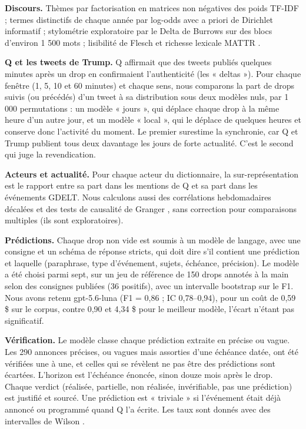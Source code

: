 \documentclass[11pt,a4paper]{article}
\begin{document}
\textbf{Discours.} Thèmes par factorisation en matrices non négatives \parencite{lee1999nmf} des poids TF-IDF ; termes distinctifs de chaque année par log-odds avec a priori de Dirichlet informatif \parencite{monroe2008fightin} ; stylométrie exploratoire par le Delta de Burrows \parencite{burrows2002delta} sur des blocs d'environ 1 500 mots ; lisibilité de Flesch \parencite{flesch1948readability} et richesse lexicale MATTR \parencite{covington2010mattr}.

\textbf{Q et les tweets de Trump.} Q affirmait que des tweets publiés quelques minutes après un drop en confirmaient l'authenticité (les « deltas »). Pour chaque fenêtre (1, 5, 10 et 60 minutes) et chaque sens, nous comparons la part de drops suivis (ou précédés) d'un tweet à sa distribution sous deux modèles nuls, par 1 000 permutations \parencite{phipson2010permutation} : un modèle « jours », qui déplace chaque drop à la même heure d'un autre jour, et un modèle « local », qui le déplace de quelques heures et conserve donc l'activité du moment. Le premier surestime la synchronie, car Q et Trump publient tous deux davantage les jours de forte actualité. C'est le second qui juge la revendication.

\textbf{Acteurs et actualité.} Pour chaque acteur du dictionnaire, la sur-représentation est le rapport entre sa part dans les mentions de Q et sa part dans les événements GDELT. Nous calculons aussi des corrélations hebdomadaires décalées et des tests de causalité de Granger \parencite{granger1969causal}, sans correction pour comparaisons multiples (ils sont exploratoires).

\textbf{Prédictions.} Chaque drop non vide est soumis à un modèle de langage, avec une consigne et un schéma de réponse stricts, qui doit dire s'il contient une prédiction et laquelle (paraphrase, type d'événement, sujets, échéance, précision). Le modèle a été choisi parmi sept, sur un jeu de référence de 150 drops annotés à la main selon des consignes publiées (36 positifs), avec un intervalle bootstrap \parencite{efron1979bootstrap} sur le F1. Nous avons retenu gpt-5.6-luna (F1 = 0,86 ; IC 0,78–0,94), pour un coût de 0,59 \$ sur le corpus, contre 0,90 et 4,34 \$ pour le meilleur modèle, l'écart n'étant pas significatif.

\textbf{Vérification.} Le modèle classe chaque prédiction extraite en précise ou vague. Les 290 annonces précises, ou vagues mais assorties d'une échéance datée, ont été vérifiées une à une, et celles qui se révèlent ne pas être des prédictions sont écartées. L'horizon est l'échéance énoncée, sinon douze mois après le drop. Chaque verdict (réalisée, partielle, non réalisée, invérifiable, pas une prédiction) est justifié et sourcé. Une prédiction est « triviale » si l'événement était déjà annoncé ou programmé quand Q l'a écrite. Les taux sont donnés avec des intervalles de Wilson \parencite{wilson1927probable}.
\end{document}
